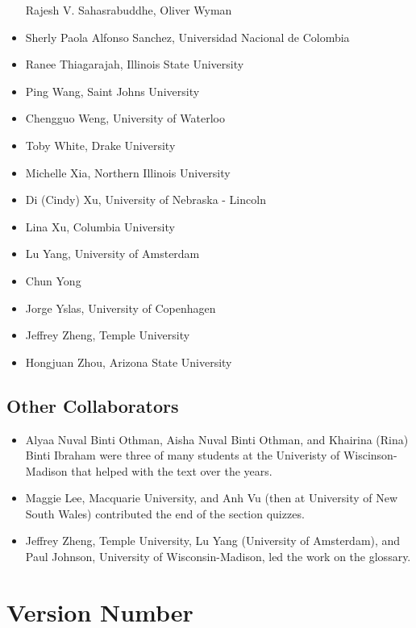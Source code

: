 \documentclass[
  12pt,
  krantz2]{Format/krantzNoCorner}
\providecommand{\tightlist}{%
  \setlength{\itemsep}{0pt}\setlength{\parskip}{0pt}}
\begin{document}
\begin{itemize}
  Rajesh V. Sahasrabuddhe, Oliver Wyman
\item
  Sherly Paola Alfonso Sanchez, Universidad Nacional de Colombia
\item
  Ranee Thiagarajah, Illinois State University
\item
  Ping Wang, Saint Johns University
\item
  Chengguo Weng, University of Waterloo
\item
  Toby White, Drake University
\item
  Michelle Xia, Northern Illinois University
\item
  Di (Cindy) Xu, University of Nebraska - Lincoln
\item
  Lina Xu, Columbia University
\item
  Lu Yang, University of Amsterdam
\item
  Chun Yong
\item
  Jorge Yslas, University of Copenhagen
\item
  Jeffrey Zheng, Temple University
\item
  Hongjuan Zhou, Arizona State University
\end{itemize}

\hypertarget{other-collaborators}{%
\subsection*{Other Collaborators}\label{other-collaborators}}


\begin{itemize}
\tightlist
\item
  Alyaa Nuval Binti Othman, Aisha Nuval Binti Othman, and Khairina (Rina) Binti Ibraham were three of many students at the Univeristy of Wiscinson-Madison that helped with the text over the years.
\item
  Maggie Lee, Macquarie University, and Anh Vu (then at University of New South Wales) contributed the end of the section quizzes.
\item
  Jeffrey Zheng, Temple University, Lu Yang (University of Amsterdam), and Paul Johnson, University of Wisconsin-Madison, led the work on the glossary.
\end{itemize}

\hypertarget{version-number}{%
\section*{Version Number}\label{version-number}}
\end{document}
